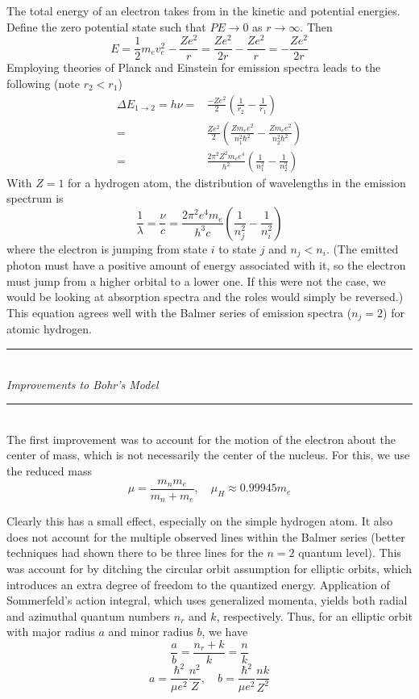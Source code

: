 \documentclass[11pt]{article}
\newcommand{\Header}[1]{\noindent\rule{\textwidth}{0.4pt}\\[0.3cm]\indent \large{\textit{#1}}\normalsize{}\\[-0.1cm]\noindent\rule{\textwidth}{0.4pt}}
\begin{document}
The total energy of an electron takes from in the kinetic and potential energies. Define the zero potential state such that $PE\to0$ as $r\to\infty$. Then
$$E = \frac{1}{2}m_ev_e^2 -\frac{Ze^2}{r} = \frac{Ze^2}{2r} - \frac{Ze^2}{r} = -\frac{Ze^2}{2r}$$
Employing theories of Planck and Einstein for emission spectra leads to the following (note $r_2 < r_1$)
\begin{align*}
\Delta E_{1\to2} = h\nu =& \frac{-Ze^2}{2}\left(\frac{1}{r_2}-\frac{1}{r_1}\right)\\
=& \frac{Ze^2}{2}\left(\frac{Zm_ee^2}{n_1^2\hbar^2}-\frac{Zm_ee^2}{n_2^2\hbar^2}\right)\\
=& \frac{2\pi^2Z^2m_ee^4}{h^2}\left(\frac{1}{n_1^2}-\frac{1}{n_2^2}\right)
\end{align*}
With $Z=1$ for a hydrogen atom, the distribution of wavelengths in the emission spectrum is
$$\frac{1}{\lambda}=\frac{\nu}{c} = \frac{2\pi^2e^4m_e}{h^3c}\left(\frac{1}{n_j^2} - \frac{1}{n_i^2}\right)$$
where the electron is jumping from state $i$ to state $j$ and $n_j < n_i$. (The emitted photon must have a positive amount of energy associated with it, so the electron must jump from a higher orbital to a lower one. If this were not the case, we would be looking at absorption spectra and the roles would simply be reversed.) This equation agrees well with the Balmer series of emission spectra ($n_j=2$) for atomic hydrogen.\\

\Header{Improvements to Bohr's Model}\\

The first improvement was to account for the motion of the electron about the center of mass, which is not necessarily the center of the nucleus. For this, we use the reduced mass
$$\mu = \frac{m_nm_e}{m_n+m_e},\quad \mu_H \approx 0.99945m_e$$

Clearly this has a small effect, especially on the simple hydrogen atom. It also does not account for the multiple observed lines within the Balmer series (better techniques had shown there to be three lines for the $n=2$ quantum level). This was account for by ditching the circular orbit assumption for elliptic orbits, which introduces an extra degree of freedom to the quantized energy. Application of Sommerfeld's action integral, which uses generalized momenta, yields both radial and azimuthal quantum numbers $n_r$ and $k$, respectively. Thus, for an elliptic orbit with major radius $a$ and minor radius $b$, we have
$$\frac{a}{b} = \frac{n_r+k}{k} = \frac{n}{k}$$
$$ a = \frac{\hbar^2}{\mu e^2}\frac{n^2}{Z},\quad b = \frac{\hbar^2}{\mu e^2}\frac{nk}{Z^2}$$
\end{document}
